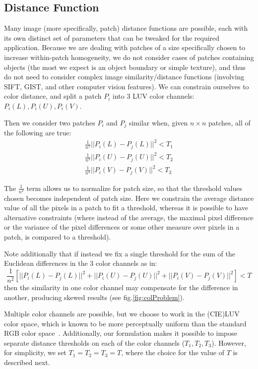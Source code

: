 \subsection{Distance Function}
\label{sec:simthresh}

Many image (more specifically, patch) distance functions are possible, each with its own distinct set of parameters that can be tweaked for the required application. Because we are dealing with patches of a size specifically chosen to increase within-patch homogeneity, we do not consider cases of patches containing objects (the most we expect is an object boundary or simple texture), and thus do not need to consider complex image similarity/distance functions (involving SIFT, GIST, and other computer vision features). We can constrain ourselves to color distance, and split a patch $P_i$ into 3 LUV color channels: $P_i(L), P_i(U), P_i(V)$.

Then we consider two patches $P_i$ and $P_j$ similar when, given $n\times n$ patches, all of the following are true:
\begin{align*}
\frac{1}{n^2}||P_i(L) - P_j(L)||^2 < T_1 \\
\frac{1}{n^2}||P_i(U) - P_j(U)||^2 < T_2 \\
\frac{1}{n^2}||P_i(V) - P_j(V)||^2 < T_3
\end{align*}

The $\frac{1}{n^2}$ term allows us to normalize for patch size, so that the threshold values chosen becomes independent of patch size. Here we constrain the average distance value of all the pixels in a patch to fit a threshold, whereas it is possible to have alternative constraints (where instead of the average, the maximal pixel difference or the variance of the pixel differences or some other measure over pixels in a patch, is compared to a threshold).

Note additionally that if instead we fix a single threshold for the sum of the Euclidean differences in the 3 color channels as in:
\begin{displaymath}
\frac{1}{n^2}[||P_i(L) - P_j(L)||^2 + ||P_i(U) - P_j(U)||^2 + ||P_i(V) - P_j(V)||^2] < T
\end{displaymath}
then the similarity in one color channel may compensate for the difference in another, producing skewed results (see fig.\ref{fig:colProblem}).

Multiple color channels are possible, but we choose to work in the (CIE)LUV color space, which is known to be more perceptually uniform than the standard RGB color space~\cite{kekre2012performance}. Additionally, our formulation makes it possible to impose separate distance thresholds on each of the color channels ($T_1,T_2,T_3$). However, for simplicity, we set $T_1=T_2=T_3=T$, where the choice for the value of $T$ is described next.

